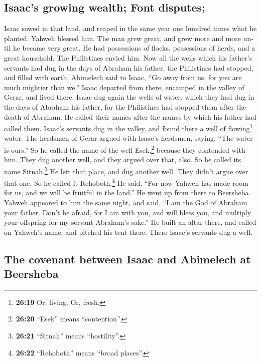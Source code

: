 \begin{paracol}{2}
\begin{otherlanguage}{english}
\hypertarget{isaacs-growing-wealth-font-disputes}{%
\subsection{Isaac's growing wealth; Font
disputes;}\label{isaacs-growing-wealth-font-disputes}}

 Isaac sowed in that land, and reaped in the same year
one hundred times what he planted. Yahweh blessed him. 
The man grew great, and grew more and more until he became very great.
 He had possessions of flocks, possessions of herds, and
a great household. The Philistines envied him.  Now all
the wells which his father's servants had dug in the days of Abraham his
father, the Philistines had stopped, and filled with earth.
 Abimelech said to Isaac, ``Go away from us, for you are
much mightier than we.''  Isaac departed from there,
encamped in the valley of Gerar, and lived there.  Isaac
dug again the wells of water, which they had dug in the days of Abraham
his father, for the Philistines had stopped them after the death of
Abraham. He called their names after the names by which his father had
called them.  Isaac's servants dug in the valley, and
found there a well of flowing\footnote{\textbf{26:19} Or, living. Or,
  fresh.} water.  The herdsmen of Gerar argued with
Isaac's herdsmen, saying, ``The water is ours.'' So he called the name
of the well Esek,\footnote{\textbf{26:20} ``Esek'' means ``contention''.}
because they contended with him.  They dug another well,
and they argued over that, also. So he called its name
Sitnah.\footnote{\textbf{26:21} ``Sitnah'' means ``hostility''.}
 He left that place, and dug another well. They didn't
argue over that one. So he called it Rehoboth.\footnote{\textbf{26:22}
  ``Rehoboth'' means ``broad places''.} He said, ``For now Yahweh has
made room for us, and we will be fruitful in the land.'' 
He went up from there to Beersheba.  Yahweh appeared to
him the same night, and said, ``I am the God of Abraham your father.
Don't be afraid, for I am with you, and will bless you, and multiply
your offspring for my servant Abraham's sake.''  He built
an altar there, and called on Yahweh's name, and pitched his tent there.
There Isaac's servants dug a well.

\hypertarget{the-covenant-between-isaac-and-abimelech-at-beersheba}{%
\subsection{The covenant between Isaac and Abimelech at
Beersheba}\label{the-covenant-between-isaac-and-abimelech-at-beersheba}}


\end{otherlanguage}
\end{paracol}
